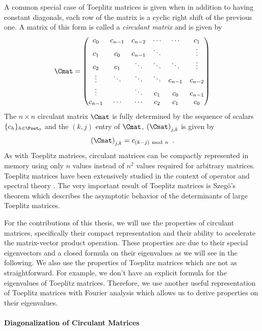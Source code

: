 A common special case of Toeplitz matrices is given when in addition to having constant diagonals, each row of the matrix is a cyclic right shift of the previous one.
A matrix of this form is called a \emph{circulant matrix} and is given by
\begin{equation}
  \Cmat =
  \leftmatrix
    c_0 & c_{n-1} & c_{n-2} & \cdots & \cdots & c_{1} \\
    c_{1} & c_0 & c_{n-1} & \ddots & & \vdots \\
    c_{2} & c_{1} & \ddots & \ddots & \ddots & \vdots \\
    \vdots & \ddots & \ddots & \ddots & c_{n-1} & c_{n-2} \\
    \vdots & & \ddots & c_{1} & c_{0} & c_{n-1} \\
    c_{n-1} & \cdots & \cdots & c_{2} & c_{1} & c_0
  \rightmatrix
\end{equation}
\noindent
The $n \times n$ circulant matrix $\Cmat$ is fully determined by the sequence of scalars $\{c_h\}_{h \in \Pset_0}$ and the $(k,j)$ entry of $\Cmat$, $\leftmat \Cmat \rightmat_{j,k}$ is given by
\begin{equation}
  \leftmat \Cmat \rightmat_{j,k} = c_{\left(k-j\right) \mod n} \enspace.
\end{equation}
As with Toeplitz matrices, circulant matrices can be compactly represented in memory using only $n$ values instead of $n^2$ values required for arbitrary matrices.
Toeplitz matrices have been extensively studied in the context of operator and spectral theory \cite{grenander1958toeplitz,widom1965toeplitz,bottcher2012introduction}.
The very important result of Toeplitz matrices is Szeg\"{o}'s theorem \cite{szego1915grenzwertsatz} which describes the asymptotic behavior of the determinants of large Toeplitz matrices.

For the contributions of this thesis, we will use the properties of circulant matrices, specifically their compact representation and their ability to accelerate the matrix-vector product operation.
These properties are due to their special eigenvectors and a closed formula on their eigenvalues as we will see in the following.
We also use the properties of Toeplitz matrices which are not as straightforward.
For example, we don't have an explicit formula for the eigenvalues of Toeplitz matrices.
Therefore, we use another useful representation of Toeplitz matrices with Fourier analysis which allows us to derive properties on their eigenvalues. 

\paragraph{Diagonalization of Circulant Matrices} ~\\

